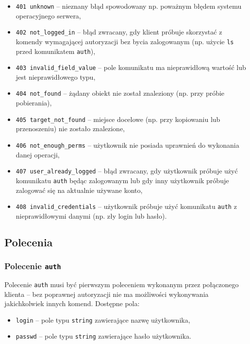 \documentclass[10pt,a4paper]{article}
\begin{document}
\begin{itemize}
    \item \texttt{401 unknown} -- nieznany błąd spowodowany np. poważnym błędem systemu operacyjnego serwera,
    \item \texttt{402 not\_logged\_in} -- błąd zwracany, gdy klient próbuje skorzystać z komendy wymagającej autoryzacji bez bycia zalogowanym (np. użycie \texttt{ls} przed komunikatem \texttt{auth}),
    \item \texttt{403 invalid\_field\_value} -- pole komunikatu ma nieprawidłową wartość lub jest nieprawidłowego typu,
    \item \texttt{404 not\_found} -- żądany obiekt nie został znaleziony (np. przy próbie  pobierania),
    \item \texttt{405 target\_not\_found} -- miejsce docelowe (np. przy kopiowaniu lub przenoszeniu) nie zostało znalezione,
    \item \texttt{406 not\_enough\_perms} -- użytkownik nie posiada uprawnień do wykonania danej operacji,
    \item \texttt{407 user\_already\_logged} -- błąd zwracany, gdy użytkownik próbuje użyć komunikatu \texttt{auth} będąc zalogowanym lub gdy inny użytkownik próbuje zalogować się na aktualnie używane konto,
    \item \texttt{408 invalid\_credentials} -- użytkownik próbuje użyć komunikatu \texttt{auth} z nieprawidłowymi danymi (np. zły login lub hasło).
\end{itemize}

\subsection{Polecenia}

%

\subsubsection{Polecenie \texttt{auth}}
Polecenie \texttt{auth} musi być pierwszym poleceniem wykonanym przez połączonego klienta -- bez poprawnej autoryzacji nie ma możliwości wykonywania jakichkolwiek innych komend. Dostępne pola:
\begin{itemize}
    \item \texttt{login} -- pole typu \texttt{string} zawierające nazwę użytkownika,
    \item \texttt{passwd} -- pole typu \texttt{string} zawierające hasło użytkownika.
\end{itemize}
\end{document}
